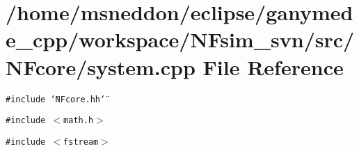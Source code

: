 \section{/home/msneddon/eclipse/ganymede\_\-cpp/workspace/NFsim\_\-svn/src/NFcore/system.cpp File Reference}
\label{system_8cpp}


{\tt \#include \char`\"{}NFcore.hh\char`\"{}}\par
{\tt \#include $<$math.h$>$}\par
{\tt \#include $<$fstream$>$}\par

